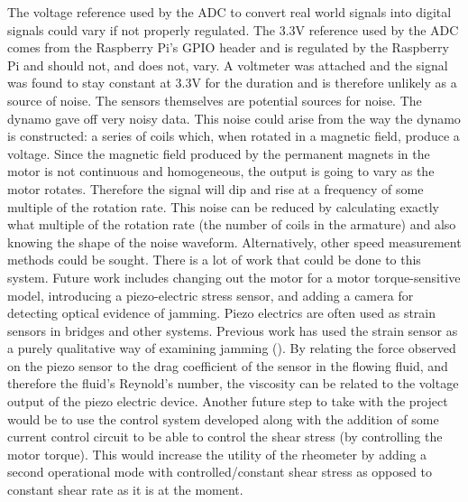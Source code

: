 \documentclass[twoside,a4]{report}
\def\br{\newline \newline \noindent}
\begin{document}
	\br
	The voltage reference used by the ADC to convert real world signals into digital signals could vary if not properly regulated. The 3.3V reference used by the ADC comes from the Raspberry Pi's GPIO header and is regulated by the Raspberry Pi and should not, and does not, vary. A voltmeter was attached and the signal was found to stay constant at 3.3V for the duration and is therefore unlikely as a source of noise. 
	\br
	The sensors themselves are potential sources for noise. The dynamo gave off very noisy data. This noise could arise from the way the dynamo is constructed: a series of coils which, when rotated in a magnetic field, produce a voltage. Since the magnetic field produced by the permanent magnets in the motor is not continuous and homogeneous, the output is going to vary as the motor rotates. Therefore the signal will dip and rise at a frequency of some multiple of the rotation rate. This noise can be reduced by calculating exactly what multiple of the rotation rate (the number of coils in the armature) and also knowing the shape of the noise waveform. Alternatively, other speed measurement methods could be sought. 
	\br %
	There is a lot of work that could be done to this system. Future work includes changing out the motor for a motor torque-sensitive model, introducing a piezo-electric stress sensor, and adding a camera for detecting optical evidence of jamming. Piezo electrics are often used as strain sensors in bridges and other systems. Previous work has used the strain sensor as a purely qualitative way of examining jamming (\cite{thescforsyth}). By relating the force observed on the piezo sensor to the drag coefficient of the sensor in the flowing fluid, and therefore the fluid's Reynold's number, the viscosity can be related to the voltage output of the piezo electric device. 
	\br
	Another future step to take with the project would be to use the control system developed along with the addition of some current control circuit to be able to control the shear stress (by controlling the motor torque). This would increase the utility of the rheometer by adding a second operational mode with controlled/constant shear stress as opposed to constant shear rate as it is at the moment.
	
	
\end{document}
